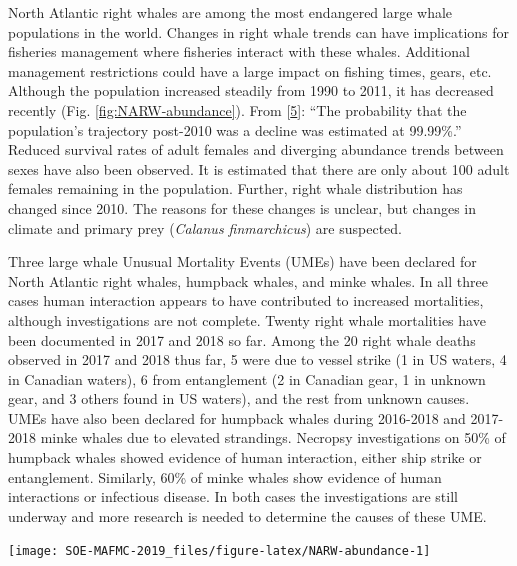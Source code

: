 \documentclass[10pt,]{article}
\let\origfigure\figure
\let\endorigfigure\endfigure
\renewenvironment{figure}[1][2] {
    \expandafter\origfigure\expandafter[H]
} {
    \endorigfigure
}
\begin{document}
North Atlantic right whales are among the most endangered large whale
populations in the world. Changes in right whale trends can have
implications for fisheries management where fisheries interact with
these whales. Additional management restrictions could have a large
impact on fishing times, gears, etc. Although the population increased
steadily from 1990 to 2011, it has decreased recently (Fig.
\ref{fig:NARW-abundance}). From
{[}\protect\hyperlink{ref-pace_statespace_2017}{5}{]}: ``The probability
that the population's trajectory post-2010 was a decline was estimated
at 99.99\%.'' Reduced survival rates of adult females and diverging
abundance trends between sexes have also been observed. It is estimated
that there are only about 100 adult females remaining in the population.
Further, right whale distribution has changed since 2010. The reasons
for these changes is unclear, but changes in climate and primary prey
(\emph{Calanus finmarchicus}) are suspected.

Three large whale Unusual Mortality Events (UMEs) have been declared for
North Atlantic right whales, humpback whales, and minke whales. In all
three cases human interaction appears to have contributed to increased
mortalities, although investigations are not complete. Twenty right
whale mortalities have been documented in 2017 and 2018 so far. Among
the 20 right whale deaths observed in 2017 and 2018 thus far, 5 were due
to vessel strike (1 in US waters, 4 in Canadian waters), 6 from
entanglement (2 in Canadian gear, 1 in unknown gear, and 3 others found
in US waters), and the rest from unknown causes. UMEs have also been
declared for humpback whales during 2016-2018 and 2017-2018 minke whales
due to elevated strandings. Necropsy investigations on 50\% of humpback
whales showed evidence of human interaction, either ship strike or
entanglement. Similarly, 60\% of minke whales show evidence of human
interactions or infectious disease. In both cases the investigations are
still underway and more research is needed to determine the causes of
these UME.

\begin{figure}

{\centering \texttt{[image: SOE-MAFMC-2019\_files/figure-latex/NARW-abundance-1]} 

}

\caption{Right whale abundance estimates with 95\% credible intervals. These values represent the estimated number of animals alive sometime during the year referenced and NOT at the end of the year referenced. Seventeen known deaths were recorded in 2017 (likely all from anthropogenic causes), but these deaths were not reflected in the 2017 estimate because those animals were alive sometime during the year.}\label{fig:NARW-abundance}
\end{figure}
\end{document}
